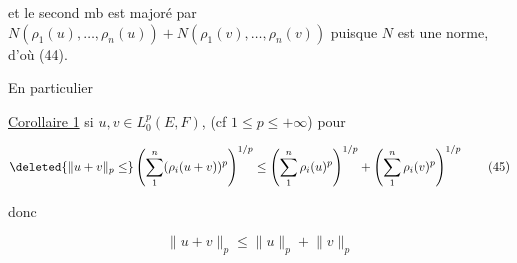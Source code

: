 et le second mb est majoré par $N(\rho_1(u),\ldots,\rho_n(u))+N(\rho_1(v),\ldots,\rho_n(v))$ puisque $N$ est une norme, d'où (44).

En particulier

\uline{Corollaire 1}  si $u,v\in L_0^p(E,F)$,  (cf $1\leq p\leq+\infty$)  pour  

\[
\deleted{\lVert u+v\rVert_p\leq}
\left(\sum_{1}^{n}(\rho_i(u+v))^p\right)^{1/p}\leq
\left(\sum_{1}^{n}\rho_i(u)^p\right)^{1/p}+
\left(\sum_{1}^{n}\rho_i(v)^p\right)^{1/p}\tag*{(45)}
\]

donc 

\[
\boxed{\lVert u+v\rVert_p\leq\lVert u\rVert_p+\lVert v\rVert_p}\tag*{(46)}
\]
